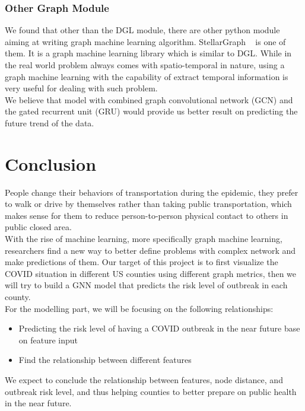 \subsubsection{Other Graph Module}

We found that other than the DGL module, there are other python module aiming at writing graph machine learning algorithm. StellarGraph ~\cite{StellarGraph} is one of them. It is a graph machine learning library which is similar to DGL. While in the real world problem always comes with spatio-temporal in nature, using a graph machine learning with the capability of extract temporal information is very useful for dealing with such problem. \\

We believe that model with combined graph convolutional network (GCN) and the gated recurrent unit (GRU) would provide us better result on predicting the future trend of the data.

 \section{Conclusion}
People change their behaviors of transportation during the epidemic, they prefer to walk or drive by themselves rather than taking public transportation, which makes sense for them to reduce person-to-person physical contact to others in public closed area.\\

With the rise of machine learning, more specifically graph machine learning, researchers find a new way to better define problems with complex network and make predictions of them. Our target of this project is to first visualize the COVID situation in different US counties using different graph metrics, then we will try to build a GNN model that predicts the risk level of outbreak in each county. \\

For the modelling part, we will be focusing on the following relationships: 
\begin{itemize}
    \item Predicting the risk level of having a COVID outbreak in the near future base on feature input
    \item Find the relationship between different features 
\end{itemize} 
We expect to conclude the relationship between features, node distance, and outbreak risk level, and thus helping counties to better prepare on public health in the near future. 

